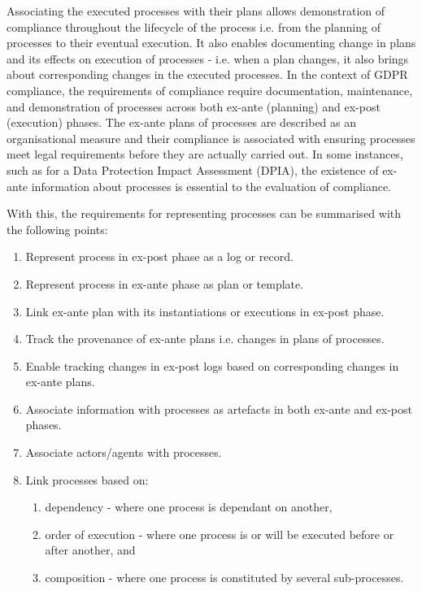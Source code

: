 Associating the executed processes with their plans allows demonstration of compliance throughout the lifecycle of the process i.e. from the planning of processes to their eventual execution. It also enables documenting change in plans and its effects on execution of processes - i.e. when a plan changes, it also brings about corresponding changes in the executed processes. In the context of GDPR compliance, the requirements of compliance require documentation, maintenance, and demonstration of processes across both ex-ante (planning) and ex-post (execution) phases. The ex-ante plans of processes are described as an organisational measure and their compliance is associated with ensuring processes meet legal requirements before they are actually carried out. In some instances, such as for a Data Protection Impact Assessment (DPIA), the existence of ex-ante information about processes is essential to the evaluation of compliance.

With this, the requirements for representing processes can be summarised with the following points:
\begin{enumerate}
    \item Represent process in ex-post phase as a log or record.
    \item Represent process in ex-ante phase as plan or template.
    \item Link ex-ante plan with its instantiations or executions in ex-post phase.
    \item Track the provenance of ex-ante plans i.e. changes in plans of processes.
    \item Enable tracking changes in ex-post logs based on corresponding changes in ex-ante plans.
    \item Associate information with processes as artefacts in both ex-ante and ex-post phases.
    \item Associate actors/agents with processes.
    \item Link processes based on:
        \begin{enumerate}
            \item dependency - where one process is dependant on another,
            \item order of execution - where one process is or will be executed before or after another, and
            \item composition - where one process is constituted by several sub-processes.
        \end{enumerate}
\end{enumerate}

